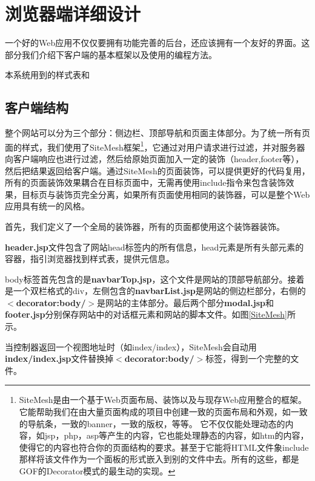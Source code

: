 \section{浏览器端详细设计}
一个好的Web应用不仅仅要拥有功能完善的后台，还应该拥有一个友好的界面。这部分我们介绍下客户端的基本框架以及使用的编程方法。

本系统用到的样式表和
\subsection{客户端结构}

整个网站可以分为三个部分：侧边栏、顶部导航和页面主体部分。为了统一所有页面的样式，我们使用了SiteMesh框架\footnote{SiteMesh是由一个基于Web页面布局、装饰以及与现存Web应用整合的框架。它能帮助我们在由大量页面构成的项目中创建一致的页面布局和外观，如一致的导航条，一致的banner，一致的版权，等等。 它不仅仅能处理动态的内容，如jsp，php，asp等产生的内容，它也能处理静态的内容，如htm的内容，使得它的内容也符合你的页面结构的要求。甚至于它能将HTML文件象include那样将该文件作为一个面板的形式嵌入到别的文件中去。所有的这些，都是GOF的Decorator模式的最生动的实现。}，它通过对用户请求进行过滤，并对服务器向客户端响应也进行过滤，然后给原始页面加入一定的装饰（header,footer等），然后把结果返回给客户端。通过SiteMesh的页面装饰，可以提供更好的代码复用，所有的页面装饰效果耦合在目标页面中，无需再使用include指令来包含装饰效果，目标页与装饰页完全分离，如果所有页面使用相同的装饰器，可以是整个Web应用具有统一的风格。

首先，我们定义了一个全局的装饰器，所有的页面都使用这个装饰器装饰。



\textbf{header.jsp}文件包含了网站head标签内的所有信息，head元素是所有头部元素的容器，指引浏览器找到样式表，提供元信息。


body标签首先包含的是\textbf{navbarTop.jsp}，这个文件是网站的顶部导航部分。接着是一个双栏格式的div，左侧包含的\textbf{navbarList.jsp}是网站的侧边栏部分，右侧的\textbf{$<$decorator:body/$>$}是网站的主体部分。最后两个部分\textbf{modal.jsp}和\textbf{footer.jsp}分别保存网站中的对话框元素和网站的脚本文件。如图\ref{SiteMesh}所示。

当控制器返回一个视图地址时（如index/index），SiteMesh会自动用\textbf{index/index.jsp}文件替换掉\textbf{$<$decorator:body/$>$}标签，得到一个完整的文件。


